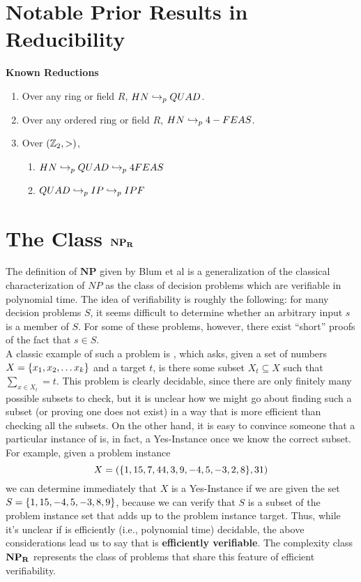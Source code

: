 \section{Notable Prior Results in Reducibility}

\begin{theorem}{\textbf{Known Reductions}}
  \begin{enumerate}
  \item Over any ring or field $R$, $HN \hookrightarrow_p QUAD$.
  \item Over any ordered ring or field $R$, $HN \hookrightarrow_p 4-FEAS$.
  \item Over $(\mathbb{Z}_2, >)$, 
    \begin{enumerate}
    \item $HN \hookrightarrow_p QUAD \hookrightarrow_p 4FEAS$
    \item $QUAD \hookrightarrow_p IP \hookrightarrow_p IPF$
    \end{enumerate}
  \end{enumerate}
\end{theorem}

\section{The Class $\mathbf{NP_R}$}

The definition of $\mathbf{NP}$ given by Blum et al is a
generalization of the classical characterization of $NP$ as the class
of decision problems which are verifiable in polynomial time.  The
idea of verifiability is roughly the following: for many decision
problems $S$, it seems difficult to determine whether an arbitrary
input $s$ is a member of $S$.  For some of these problems, however,
there exist ``short'' proofs of the fact that $s \in S$.\\

A classic example of such a problem is \subsum, which asks, given a
set of numbers $X = \{x_1, x_2, \ldots x_k\}$ and a target $t$, is
there some subset $X_t \subseteq X$ such that $\sum_{x \in X_t} = t$.
This problem is clearly decidable, since there are only finitely many
possible subsets to check, but it is unclear how we might go about
finding such a subset (or proving one does not exist) in a way that is
more efficient than checking all the subsets.  On the other hand, it
is easy to convince someone that a particular instance of \subsum
is, in fact, a Yes-Instance once we know the correct subset.  For
example, given a problem instance 
$$X = (\{1, 15, 7, 44, 3, 9, -4, 5, -3, 2, 8\}, 31)$$
we can determine immediately that $X$ is a Yes-Instance if we are
given the set $S = \{1,15,-4,5, -3, 8, 9\}$, because we can verify
that $S$ is a subset of the problem instance set that adds up to the
problem instance target.  Thus, while it's unclear if \subsum is
efficiently (i.e., polynomial time) decidable, the above
considerations lead us to say that \subsum is \textbf{efficiently
  verifiable}.  The complexity class $\mathbf{NP_R}$ represents the class of
problems that share this feature of efficient verifiability.

